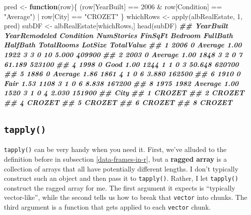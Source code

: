 \documentclass[
  12pt,
  krantz2]{krantz}
\makeatletter
\newenvironment{Shaded}{\begin{snugshade}}{\end{snugshade}}
\newcommand{\ControlFlowTok}[1]{\textcolor[rgb]{0.27,0.27,0.27}{\textbf{#1}}}
\newcommand{\DecValTok}[1]{\textcolor[rgb]{0.06,0.06,0.06}{#1}}
\newcommand{\DocumentationTok}[1]{\textcolor[rgb]{0.37,0.37,0.37}{\textbf{\textit{#1}}}}
\newcommand{\FunctionTok}[1]{\textcolor[rgb]{0,0,0}{#1}}
\newcommand{\NormalTok}[1]{#1}
\newcommand{\OtherTok}[1]{\textcolor[rgb]{0.37,0.37,0.37}{#1}}
\newcommand{\SpecialCharTok}[1]{\textcolor[rgb]{0,0,0}{#1}}
\newcommand{\StringTok}[1]{\textcolor[rgb]{0.5,0.5,0.5}{#1}}
\newenvironment{kframe}{%
\medskip{}
\setlength{\fboxsep}{.8em}
 \def\at@end@of@kframe{}%
 \ifinner\ifhmode%
  \def\at@end@of@kframe{\end{minipage}}%
  \begin{minipage}{\columnwidth}%
 \fi\fi%
 \def\FrameCommand##1{\hskip\@totalleftmargin \hskip-\fboxsep
 \colorbox{shadecolor}{##1}\hskip-\fboxsep
     \hskip-\linewidth \hskip-\@totalleftmargin \hskip\columnwidth}%
 \MakeFramed {\advance\hsize-\width
   \@totalleftmargin\z@ \linewidth\hsize
   \@setminipage}}%
 {\par\unskip\endMakeFramed%
 \at@end@of@kframe}
\renewenvironment{Shaded}{\begin{kframe}}{\end{kframe}}
\makeatother
\begin{document}
\begin{Shaded}
\begin{Highlighting}[]
\NormalTok{pred }\OtherTok{\textless{}{-}} \ControlFlowTok{function}\NormalTok{(row)\{}
\NormalTok{  (row[}\StringTok{\textquotesingle{}YearBuilt\textquotesingle{}}\NormalTok{] }\SpecialCharTok{==} \DecValTok{2006} \SpecialCharTok{\&}\NormalTok{ row[}\StringTok{\textquotesingle{}Condition\textquotesingle{}}\NormalTok{] }\SpecialCharTok{==} \StringTok{"Average"}\NormalTok{) }\SpecialCharTok{|}\NormalTok{ row[}\StringTok{\textquotesingle{}City\textquotesingle{}}\NormalTok{] }\SpecialCharTok{==} \StringTok{"CROZET"}
\NormalTok{\}}
\NormalTok{whichRows }\OtherTok{\textless{}{-}} \FunctionTok{apply}\NormalTok{(albRealEstate, }\DecValTok{1}\NormalTok{, pred)}
\NormalTok{subDF }\OtherTok{\textless{}{-}}\NormalTok{ albRealEstate[whichRows,]}
\FunctionTok{head}\NormalTok{(subDF)}
\DocumentationTok{\#\#   YearBuilt YearRemodeled Condition NumStories FinSqFt Bedroom FullBath HalfBath TotalRooms LotSize TotalValue}
\DocumentationTok{\#\# 1      2006             0   Average       1.00    1922       3        3        0         10   5.000     409900}
\DocumentationTok{\#\# 2      2003             0   Average       1.00    1848       3        2        0          7  61.189     523100}
\DocumentationTok{\#\# 4      1998             0      Good       1.00    1244       1        1        0          3  50.648     620700}
\DocumentationTok{\#\# 5      1886             0   Average       1.86    1861       4        1        0          6   3.880     162500}
\DocumentationTok{\#\# 6      1910             0      Fair       1.53    1108       3        1        0          6   8.838     167200}
\DocumentationTok{\#\# 8      1975          1982   Average       1.00    1520       3        1        0          4   2.030     151900}
\DocumentationTok{\#\#     City}
\DocumentationTok{\#\# 1 CROZET}
\DocumentationTok{\#\# 2 CROZET}
\DocumentationTok{\#\# 4 CROZET}
\DocumentationTok{\#\# 5 CROZET}
\DocumentationTok{\#\# 6 CROZET}
\DocumentationTok{\#\# 8 CROZET}
\end{Highlighting}
\end{Shaded}

\hypertarget{tapply}{%
\subsection{\texorpdfstring{\texttt{tapply()}}{tapply()}}\label{tapply}}

\texttt{tapply()} can be very handy when you need it. First, we've alluded to the definition before in subsection \ref{data-frames-in-r}, but a \textbf{ragged array} is a collection of arrays that all have potentially different lengths. I don't typically construct such an object and then pass it to \texttt{tapply()}. Rather, I let \texttt{tapply()} construct the ragged array for me. The first argument it expects is ``typically vector-like'', while the second tells us how to break that \texttt{vector} into chunks. The third argument is a function that gets applied to each \texttt{vector} chunk.
\end{document}
